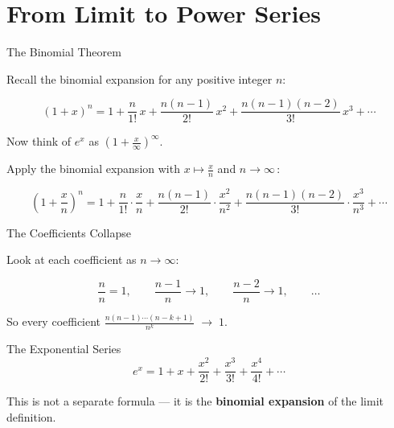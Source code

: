 \documentclass[10pt]{beamer}
\theoremstyle{definition}
\newcommand{\x}[1]{\alert{\textbf{#1}}}
\begin{document}
\section{From Limit to Power Series}


\begin{frame}{The Binomial Theorem}

Recall the binomial expansion for any positive integer $n$:

$$(1+x)^n = 1 + \frac{n}{1!}\,x + \frac{n(n-1)}{2!}\,x^2 + \frac{n(n-1)(n-2)}{3!}\,x^3 + \cdots$$

\vfill\pause

Now think of $e^x$ as $\left(1 + \frac{x}{\infty}\right)^{\infty}$.

\vfill

Apply the binomial expansion with $x \mapsto \frac{x}{n}$ and $n \to \infty$\,:

$$\left(1+\frac{x}{n}\right)^n = 1 + \frac{n}{1!}\cdot\frac{x}{n} + \frac{n(n-1)}{2!}\cdot\frac{x^2}{n^2} + \frac{n(n-1)(n-2)}{3!}\cdot\frac{x^3}{n^3} + \cdots$$

\end{frame}


\begin{frame}{The Coefficients Collapse}

Look at each coefficient as $n\to\infty$:

\vfill

$$\frac{n}{n} = 1, \qquad \frac{n-1}{n} \to 1, \qquad \frac{n-2}{n} \to 1, \qquad \ldots$$

\vfill\pause

So every coefficient $\displaystyle\frac{n(n-1)\cdots(n-k+1)}{n^k} \;\longrightarrow\; 1$.

\vfill\pause

\begin{block}{The Exponential Series}
$$\boxed{e^x = 1 + x + \frac{x^2}{2!} + \frac{x^3}{3!} + \frac{x^4}{4!} + \cdots}$$
\end{block}

\vfill

This is not a separate formula --- it is the \x{binomial expansion} of the limit definition.

\end{frame}
\end{document}
